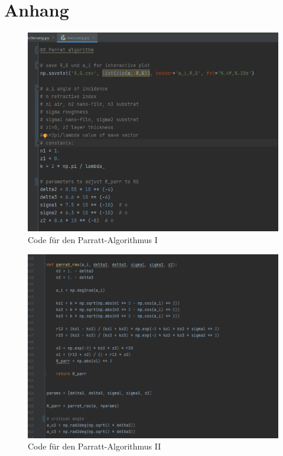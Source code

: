 \newpage
\section{Anhang}
\label{sec:anhang}
\begin{figure}[h!]
  \centering
  \includegraphics[scale=0.7]{fig/parrat1.png}
  \caption{Code für den Parratt-Algorithmus I}
  \label{abb:mess1}
\end{figure}
\begin{figure}[h!]
  \centering
  \includegraphics[scale=0.5]{fig/parrat2.png}
  \caption{Code für den Parratt-Algorithmus II}
  \label{abb:mess2}
\end{figure}
